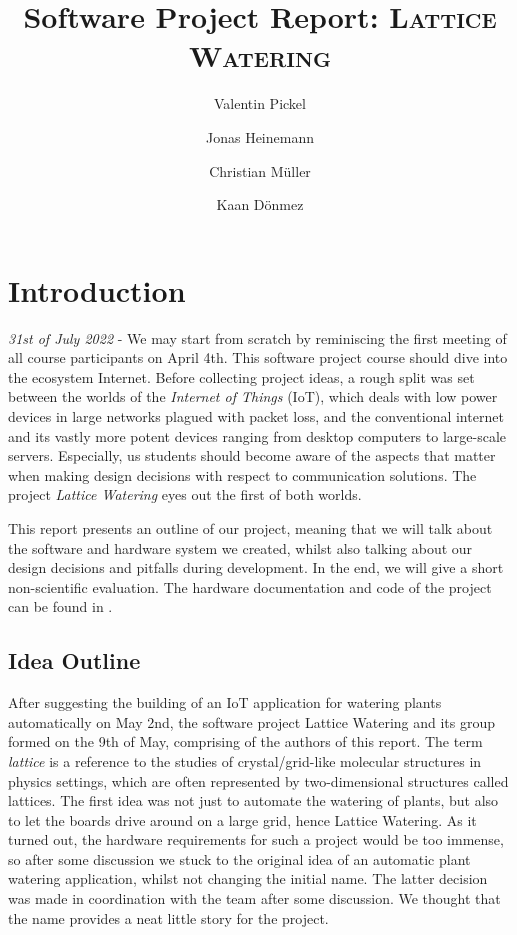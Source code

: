 \documentclass[acmtog, language=english, nonacm]{acmart}
\title{Software Project Report: \textsc{Lattice Watering}}
\author{Valentin Pickel}
\author{Jonas Heinemann}
\author{Christian Müller}
\author{Kaan Dönmez}
\affiliation{%
    \department[0]{Institute for Computer Science}%
    \institution{Freie Universität Berlin}%
    \city{Berlin}%
    \country{Germany}}
\begin{document}
    \maketitle

    \section{Introduction}

    \emph{31st of July 2022} - We may start from scratch by reminiscing the first meeting of all course participants on April 4th. This software project course should dive into the ecosystem Internet. Before collecting project ideas, a rough split was set between the worlds of the \emph{Internet of Things} (IoT), which deals with low power devices in large networks plagued with packet loss, and the conventional internet and its vastly more potent devices ranging from desktop computers to large-scale servers. Especially, us students should become aware of the aspects that matter when making design decisions with respect to communication solutions. The project \emph{Lattice Watering} eyes out the first of both worlds.

    This report presents an outline of our project, meaning that we will talk about the software and hardware system we created, whilst also talking about our design decisions and pitfalls during development. In the end, we will give a short non-scientific evaluation. The hardware documentation and code of the project can be found in \cite{lattice-watering}.

    \subsection{Idea Outline}

    After suggesting the building of an IoT application for watering plants automatically on May 2nd, the software project Lattice Watering and its group formed on the 9th of May, comprising of the authors of this report. The term \emph{lattice} is a reference to the studies of crystal/grid-like molecular structures in physics settings, which are often represented by two-dimensional structures called lattices. The first idea was not just to automate the watering of plants, but also to let the boards drive around on a large grid, hence Lattice Watering. As it turned out, the hardware requirements for such a project would be too immense, so after some discussion we stuck to the original idea of an automatic plant watering application, whilst not changing the initial name. The latter decision was made in coordination with the team after some discussion. We thought that the name provides a neat little story for the project.
\end{document}
